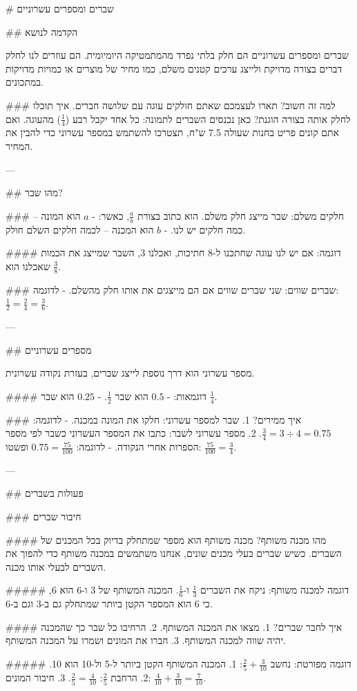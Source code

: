 # שברים ומספרים עשרוניים

## הקדמה לנושא

שברים ומספרים עשרוניים הם חלק בלתי נפרד מהמתמטיקה היומיומית. הם עוזרים לנו לחלק דברים בצורה מדויקת ולייצג ערכים קטנים משלם, כמו מחיר של מוצרים או כמויות מדויקות במתכונים.

### למה זה חשוב?
תארו לעצמכם שאתם חולקים עוגה עם שלושה חברים. איך תוכלו לחלק אותה בצורה הוגנת? כאן נכנסים השברים לתמונה: כל אחד יקבל רבע ($\frac{1}{4}$) מהעוגה. ואם אתם קונים פריט בחנות שעולה 7.5 ש"ח, תצטרכו להשתמש במספר עשרוני כדי להבין את המחיר.

---

## מהו שבר?

### חלקים משלם:
שבר מייצג חלק משלם. הוא כתוב בצורת $\frac{a}{b}$, כאשר:
- $a$ הוא המונה – כמה חלקים יש לנו.
- $b$ הוא המכנה – לכמה חלקים השלם חולק.

#### דוגמה:
אם יש לנו עוגה שחתכנו ל-8 חתיכות, ואכלנו 3, השבר שמייצג את הכמות שאכלנו הוא $\frac{3}{8}$.

### שברים שווים:
שני שברים שווים אם הם מייצגים את אותו חלק מהשלם.
- לדוגמה: $\frac{1}{2} = \frac{2}{4} = \frac{3}{6}$.

---

## מספרים עשרוניים

מספר עשרוני הוא דרך נוספת לייצג שברים, בעזרת נקודה עשרונית.

#### דוגמאות:
- $0.5$ הוא שבר $\frac{1}{2}$.
- $0.25$ הוא שבר $\frac{1}{4}$.

### איך ממירים?
1. שבר למספר עשרוני: חלקו את המונה במכנה.
   - לדוגמה: $\frac{3}{4} = 3 \div 4 = 0.75$.
2. מספר עשרוני לשבר: כתבו את המספר העשרוני כשבר לפי מספר הספרות אחרי הנקודה.
   - לדוגמה: $0.75 = \frac{75}{100}$ ופשטו: $\frac{75}{100} = \frac{3}{4}$.

---

## פעולות בשברים

### חיבור שברים

#### מהו מכנה משותף?
מכנה משותף הוא מספר שמתחלק בדיוק בכל המכנים של השברים. כשיש שברים בעלי מכנים שונים, אנחנו משתמשים במכנה משותף כדי להפוך את השברים לבעלי אותו מכנה.

##### דוגמה למכנה משותף:
ניקח את השברים $\frac{1}{3}$ ו-$\frac{1}{6}$. המכנה המשותף של 3 ו-6 הוא 6, כי 6 הוא המספר הקטן ביותר שמתחלק גם ב-3 וגם ב-6.

#### איך לחבר שברים?
1. מצאו את המכנה המשותף.
2. הרחיבו כל שבר כך שהמכנה יהיה שווה למכנה המשותף.
3. חברו את המונים ושמרו על המכנה המשותף.

##### דוגמה מפורטת:
נחשב $\frac{2}{5} + \frac{3}{10}$:
1. המכנה המשותף הקטן ביותר ל-5 ול-10 הוא 10.
2. הרחבת $\frac{2}{5}$: $\frac{2}{5} = \frac{4}{10}$.
3. חיבור המונים: $\frac{4}{10} + \frac{3}{10} = \frac{7}{10}$.

